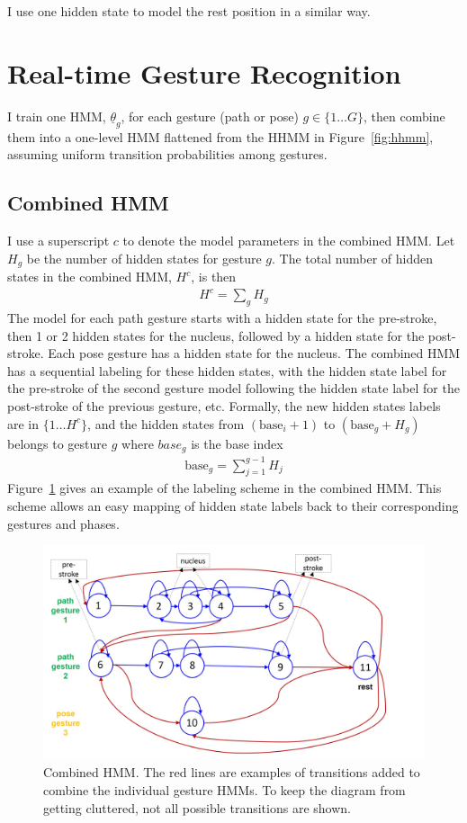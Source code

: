 I use one hidden state to model the rest position in a similar way.

\section{Real-time Gesture Recognition}
I train one HMM, $\underline{\theta}_g$, for each gesture (path or pose) $g\in
\{1\ldots G\}$, then combine them into a one-level HMM flattened from the HHMM
in Figure~\ref{fig:hhmm}, assuming uniform transition probabilities among
gestures.

\subsection{Combined HMM}\label{sec:combined}
I use a superscript $c$ to denote the model
parameters in the combined HMM. Let $H_{g}$ be the number of hidden states for
gesture $g$. The total number of hidden states in the combined HMM, $H^c$, is then
\begin{align*}
H^c = \sum_g H_{g}
\end{align*}
The model for each path gesture starts with a hidden state for the pre-stroke,
then 1 or 2 hidden states for the nucleus, followed by a hidden state for the
post-stroke. Each pose gesture has a hidden state for the nucleus. The combined
HMM has a sequential labeling for these hidden states, with the hidden state label for the pre-stroke of the second gesture model following
the hidden state label for the post-stroke of the previous gesture, etc.
Formally, the new hidden states labels are in $\{1\ldots H^c\}$, and
the hidden states from $(\text{base}_i + 1)$ to $(\text{base}_g + H_{g})$
belongs to gesture $g$ where $base_g$ is the base index
\begin{align*}
\text{base}_g = \sum_{j=1}^{g-1}H_{j}
\end{align*}
Figure~\ref{fig:combined-hmm} gives an example of the labeling scheme in
the combined HMM. This scheme allows an easy mapping of hidden state labels
back to their corresponding gestures and phases.

\begin{figure}[!tbh]
\centering
\includegraphics[width=\columnwidth]{figures/combined_hmm.jpg}
\caption{Combined HMM. The red lines are examples of transitions added to
combine the individual gesture HMMs.
To keep the diagram from getting cluttered, not all possible transitions are shown.}
\label{fig:combined-hmm}
\end{figure}

